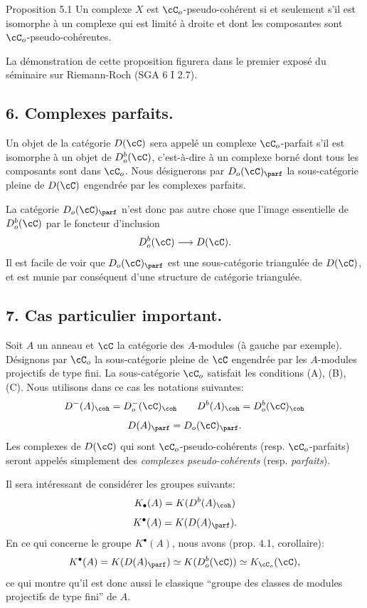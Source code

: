 \begin{statement}{Proposition 5.1}
Un complexe $X$ est $\cC_o$-pseudo-cohérent si et seulement s'il est isomorphe à un complexe qui est limité à droite et dont les composantes sont $\cC_o$-pseudo-cohérentes.
\end{statement}

La démonstration de cette proposition figurera dans le premier exposé du séminaire sur Riemann-Roch (SGA 6 I 2.7).

\subsection*{6. Complexes parfaits.}

Un objet de la catégorie $D(\cC)$ sera appelé un complexe $\cC_o$-parfait s'il est isomorphe à un objet de $D_o^b(\cC)$, c'est-à-dire à un complexe borné dont tous les composants sont dans $\cC_o$. Nous désignerons par $D_o(\cC)_{\parf}$ la sous-catégorie pleine de $D(\cC)$ engendrée par les complexes parfaits.

La catégorie $D_o(\cC)_{\parf}$ n'est donc pas autre chose que l'image essentielle de $D_o^b(\cC)$ par le foncteur d'inclusion
\[
D_o^b(\cC)\longrightarrow D(\cC).
\]
Il est facile de voir que $D_o(\cC)_{\parf}$ est une sous-catégorie triangulée de $D(\cC)$, et est munie par conséquent d'une structure de catégorie triangulée.

\subsection*{7. Cas particulier important.}

Soit $A$ un anneau et $\cC$ la catégorie des $A$-modules (à gauche par exemple). Désignons par $\cC_o$ la sous-catégorie pleine de $\cC$ engendrée par les $A$-modules projectifs de type fini. La sous-catégorie $\cC_o$ satisfait les conditions (A), (B), 
(C).
Nous utilisons dans ce cas les notations suivantes:
\[
D^-(A)_{\coh}=D_o^-(\cC)_{\coh}\qquad
D^b(A)_{\coh}=D_o^b(\cC)_{\coh}
\]
\[
D(A)_{\parf}=D_o(\cC)_{\parf}.
\]
Les complexes de $D(\cC)$ qui sont $\cC_o$-pseudo-cohérents (resp. $\cC_o$-parfaits) seront appelés simplement des \emph{complexes pseudo-cohérents} (resp. \emph{parfaits}).

Il sera intéressant de considérer les groupes suivants:
\[
K_\bullet(A)=K(D^b(A)_{\coh})
\]
\[
K^\bullet(A)=K(D(A)_{\parf}).
\]
En ce qui concerne le groupe $K^\bullet(A)$, nous avons (prop. 4.1, corollaire):
\[
K^\bullet(A)=K(D(A)_{\parf})\simeq K(D_o^b(\cC))\simeq K_{\cC_o}(\cC),
\]
ce qui montre qu'il est donc aussi le classique ``groupe des classes de modules projectifs de type fini'' de $A$.

